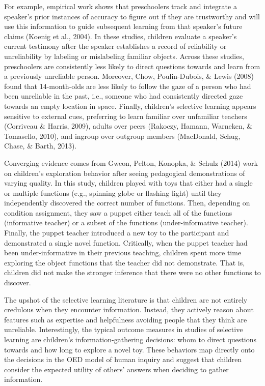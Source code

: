 \documentclass[oneside]{report}
\begin{document}
For example, empirical work shows that preschoolers track and integrate
a speaker's prior instances of accuracy to figure out if they are
trustworthy and will use this information to guide subsequent learning
from that speaker's future claims (Koenig et al., 2004). In these
studies, children evaluate a speaker's current testimony after the
speaker establishes a record of reliability or unreliability by labeling
or mislabeling familiar objects. Across these studies, preschoolers are
consistently less likely to direct questions towards and learn from a
previously unreliable person. Moreover, Chow, Poulin-Dubois, \& Lewis
(2008) found that 14-month-olds are less likely to follow the gaze of a
person who had been unreliable in the past, i.e., someone who had
consistently directed gaze towards an empty location in space. Finally,
children's selective learning appears sensitive to external cues,
preferring to learn familiar over unfamiliar teachers (Corriveau \&
Harris, 2009), adults over peers (Rakoczy, Hamann, Warneken, \&
Tomasello, 2010), and ingroup over outgroup members (MacDonald, Schug,
Chase, \& Barth, 2013).

Converging evidence comes from Gweon, Pelton, Konopka, \& Schulz (2014)
work on children's exploration behavior after seeing pedagogical
demonstrations of varying quality. In this study, children played with
toys that either had a single or multiple functions (e.g., spinning
globe or flashing light) until they independently discovered the correct
number of functions. Then, depending on condition assignment, they saw a
puppet either teach all of the functions (informative teacher) or a
subset of the functions (under-informative teacher). Finally, the puppet
teacher introduced a new toy to the participant and demonstrated a
single novel function. Critically, when the puppet teacher had been
under-informative in their previous teaching, children spent more time
exploring the object functions that the teacher did not demonstrate.
That is, children did not make the stronger inference that there were no
other functions to discover.

The upshot of the selective learning literature is that children are not
entirely credulous when they encounter information. Instead, they
actively reason about features such as expertise and helpfulness
avoiding people that they think are unreliable. Interestingly, the
typical outcome measures in studies of selective learning are children's
information-gathering decisions: whom to direct questions towards and
how long to explore a novel toy. These behaviors map directly onto the
decisions in the OED model of human inquiry and suggest that children
consider the expected utility of others' answers when deciding to gather
information.
\end{document}
